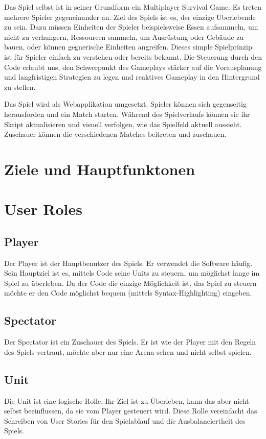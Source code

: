 \documentclass[a4paper, 11pt]{scrartcl}
\let\oldsection\section
\renewcommand\section{\clearpage\oldsection}
\begin{document}
Das Spiel selbst ist in seiner Grundform ein Multiplayer Survival Game. Es treten mehrere Spieler gegeneinander an. Ziel des Spiels ist es, der einzige Überlebende zu sein. Dazu müssen  Einheiten der Spieler beispielsweise Essen aufsammeln, um nicht zu verhungern, Ressourcen sammeln, um Ausrüstung oder Gebäude zu bauen, oder können gegnerische Einheiten angreifen. Dieses simple Spielprinzip ist für Spieler einfach zu verstehen oder bereits bekannt. Die Steuerung durch den Code erlaubt uns, den Schwerpunkt des Gameplays stärker auf die Vorausplanung und langfristigen Strategien zu legen und reaktives Gameplay in den Hintergrund zu stellen.

Das Spiel wird als Webapplikation umgesetzt. Spieler können sich gegenseitig herausforden und ein Match starten. Während des Spielverlaufs können sie ihr Skript aktualisieren und visuell verfolgen, wie das Spielfeld aktuell aussieht. Zuschauer können die verschiedenen Matches beitreten und zuschauen.

\section{Ziele und Hauptfunktonen}

\section{User Roles}
\subsection{Player}
Der Player ist der Hauptbenutzer des Spiels. Er verwendet die Software häufig. Sein Hauptziel ist es, mittels Code seine Units zu steuern, um möglichst lange im Spiel zu überleben. Da der Code die einzige Möglichkeit ist, das Spiel zu steuern möchte er den Code möglichst bequem (mittels Syntax-Highlighting) eingeben.
\subsection{Spectator}
Der Spectator ist ein Zuschauer des Spiels. Er ist wie der Player mit den Regeln des Spiels vertraut, möchte aber nur eine Arena sehen und nicht selbst spielen.
\subsection{Unit}
Die Unit ist eine logische Rolle. Ihr Ziel ist zu Überleben, kann das aber nicht selbst beeinflussen, da sie vom Player gesteuert wird. Diese Rolle vereinfacht das Schreiben von User Stories für den Spielablauf und die Ausbalanciertheit des Spiels.
\end{document}
